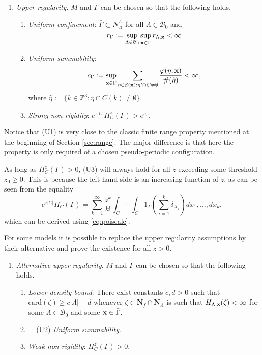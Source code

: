 \begin{enumerate}[\textbf{(U)}] 
	\item \textit{Upper regularity}. $M$ and $\Gamma$ can be chosen so that the following holds. 
		\begin{enumerate}[(U1)]
			\item \textit{Uniform confinement}: $\bar \Gamma \subset N^\Lambda_\text{cr}$ for all $\Lambda \in \mathcal B_0$ and 
			\begin{equation}\label{eq:U1}r_\Gamma := \sup_{\Lambda\in\mathcal B_0}\sup_{{\mathbf{x}} \in \bar\Gamma} r_{\Lambda, {\mathbf{x}}} < \infty\end{equation}
			\item \textit{Uniform summability}: 
			$$c_\Gamma := \sup_{{\mathbf{x}} \in \bar\Gamma}  \sum_{\eta \in \mathcal E({\mathbf{x}}): \eta' \cap C \neq \emptyset} \frac{\varphi(\eta,{\mathbf{x}})}{\#(\hat\eta)} < \infty,$$
where $\hat\eta := \{k \in \mathbb Z^3: \eta \cap C(k) \neq \emptyset\}$.
\item \textit{Strong non-rigidity}: $e^{z|C|} \Pi^z_C(\Gamma) > e^{c_\Gamma}$.
		\end{enumerate}
\end{enumerate}

Notice that (U1) is very close to the classic finite range property mentioned at the beginning of Section \ref{sec:range}. The major difference is that here the property is only required of a chosen pseudo-periodic configuration.


As long as $\Pi^z_C (\Gamma) >0$, (U3) will always hold for all $z$ exceeding some threshold $z_0 \geq 0$. This is because the left hand side is an increasing function of $z$, as can be seen from the equality 
$$e^{z|C|} \Pi^z_C(\Gamma) = \sum^\infty_{k=1} \frac{z^k}{k!} \int_C \cdots \int_C 1_{\Gamma} \left(\sum^k_{i=1} \delta_{X_i}\right) dx_1, \dots, dx_k,$$
which can be derived using \eqref{eq:poiscalc}. 



For some models it is possible to replace the upper regularity assumptions by their alternative and prove the existence for all $z>0$.

\begin{enumerate}[(\textbf{\^{U}})]
	\item \textit{Alternative upper regularity}. $M$ and $\Gamma$ can be chosen so that the following holds.
	\begin{enumerate}[(\^U1)]
		\item \textit{Lower density bound}: There exist constants $c,d > 0$ such that $\mathrm{card}(\zeta) \geq c|\Lambda| - d$ whenever $\zeta \in \mathbf N_f\cap\mathbf  N_\Lambda$ is such that $H_{\Lambda,{\mathbf{x}}}(\zeta)<\infty$ for some $\Lambda \in \mathcal B_0$ and some ${\mathbf{x}} \in \bar\Gamma$.
		\item = (U2) \textit{Uniform summability}.
		\item \textit{Weak non-rigidity}: $\Pi^z_C(\Gamma) > 0$.
	\end{enumerate}
\end{enumerate}







